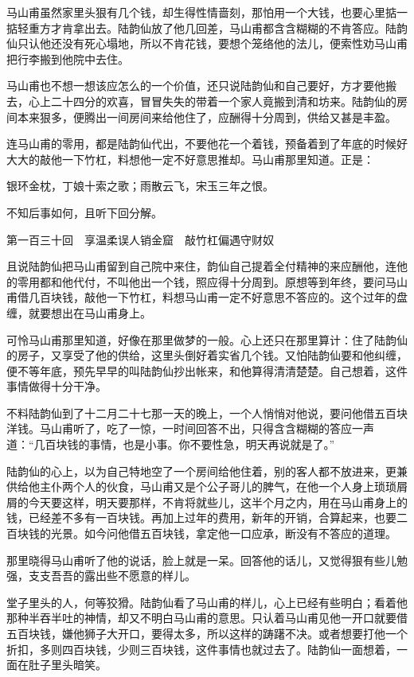 \documentclass[12pt,UTF8]{ctexbook}
\begin{document}
{{{马山甫虽然家里头狠有几个钱，却生得性情啬刻，那怕用一个大钱，也要心里掂一掂轻重方才肯拿出去。陆韵仙放了他几回差，马山甫都含含糊糊的不肯答应。陆韵仙只认他还没有死心塌地，所以不肯花钱，要想个笼络他的法儿，便索性劝马山甫把行李搬到他院中去住。

马山甫也不想一想该应怎么的一个价值，还只说陆韵仙和自己要好，方才要他搬去，心上二十四分的欢喜，冒冒失失的带着一个家人竟搬到清和坊来。陆韵仙的房间本来狠多，便腾出一间房间来给他住了，应酬得十分周到，供给又甚是丰盈。

连马山甫的零用，都是陆韵仙代出，不要他花一个着钱，预备着到了年底的时候好大大的敲他一下竹杠，料想他一定不好意思推却。马山甫那里知道。正是：

银环金枕，丁娘十索之歌；雨散云飞，宋玉三年之恨。

不知后事如何，且听下回分解。





第一百三十回　享温柔误人销金窟　敲竹杠偏遇守财奴





且说陆韵仙把马山甫留到自己院中来住，韵仙自己提着全付精神的来应酬他，连他的零用都和他代付，不叫他出一个钱，照应得十分周到。原想等到年终，要问马山甫借几百块钱，敲他一下竹杠，料想马山甫一定不好意思不答应的。这个过年的盘缠，就要想出在马山甫身上。

可怜马山甫那里知道，好像在那里做梦的一般。心上还只在那里算计：住了陆韵仙的房子，又享受了他的供给，这里头倒好着实省几个钱。又怕陆韵仙要和他纠缠，便不等年底，预先早早的叫陆韵仙抄出帐来，和他算得清清楚楚。自己想着，这件事情做得十分干净。

不料陆韵仙到了十二月二十七那一天的晚上，一个人悄悄对他说，要问他借五百块洋钱。马山甫听了，吃了一惊，一时间回答不出，只得含含糊糊的答应一声道：“几百块钱的事情，也是小事。你不要性急，明天再说就是了。”

陆韵仙的心上，以为自己特地空了一个房间给他住着，别的客人都不放进来，更兼供给他主仆两个人的伙食，马山甫又是个公子哥儿的脾气，在他一个人身上琐琐屑屑的今天要这样，明天要那样，不肯将就些儿，这半个月之内，用在马山甫身上的钱，已经差不多有一百块钱。再加上过年的费用，新年的开销，合算起来，也要二百块钱的光景。如今问他借五百块钱，拿定他一口应承，断没有不答应的道理。

那里晓得马山甫听了他的说话，脸上就是一呆。回答他的话儿，又觉得狠有些儿勉强，支支吾吾的露出些不愿意的样儿。

堂子里头的人，何等狡猾。陆韵仙看了马山甫的样儿，心上已经有些明白；看着他那种半吞半吐的神情，却又不明白马山甫的意思。只认着马山甫见他一开口就要借五百块钱，嫌他狮子大开口，要得太多，所以这样的踌躇不决。或者想要打他一个折扣，多则四百块钱，少则三百块钱，这件事情也就过去了。陆韵仙一面想着，一面在肚子里头暗笑。

}}}
\end{document}
